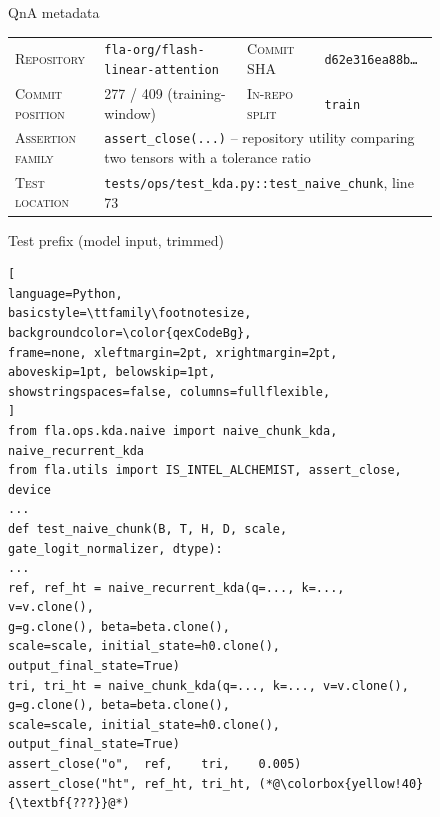 \documentclass[11pt]{article}
\begin{document}
\begin{figure}[!htbp]
\begin{center}
\begin{tcolorbox}[
enhanced,
colback=white, colframe=qexHead, coltitle=white,
fonttitle=\bfseries,
title={Detailed qualitative example: \texttt{fla-org/flash-linear-attention} (IR test, commit-derived)},
arc=3pt, boxrule=0.6pt,
top=3pt, bottom=3pt, left=6pt, right=6pt,
]

\begin{qexsection}{QnA metadata}
\footnotesize
\begin{tabular}{@{}l@{\;\;}l@{\hskip 14pt}l@{\;\;}l@{}}
\textsc{Repository}      & \texttt{fla-org/flash-linear-attention}     & \textsc{Commit SHA}        & \texttt{d62e316ea88b\ldots} \\
\textsc{Commit position} & 277 / 409 (training-window)                 & \textsc{In-repo split}     & \texttt{train} \\
\textsc{Assertion family} & \multicolumn{3}{l}{\texttt{assert\_close(...)} -- repository utility comparing two tensors with a tolerance ratio} \\
\textsc{Test location}   & \multicolumn{3}{l}{\texttt{tests/ops/test\_kda.py::test\_naive\_chunk}, line 73} \\
\end{tabular}
\end{qexsection}

\begin{qexsection}{Test prefix (model input, trimmed)}
\begin{lstlisting}[
language=Python,
basicstyle=\ttfamily\footnotesize,
backgroundcolor=\color{qexCodeBg},
frame=none, xleftmargin=2pt, xrightmargin=2pt,
aboveskip=1pt, belowskip=1pt,
showstringspaces=false, columns=fullflexible,
]
from fla.ops.kda.naive import naive_chunk_kda, naive_recurrent_kda
from fla.utils import IS_INTEL_ALCHEMIST, assert_close, device
...
def test_naive_chunk(B, T, H, D, scale, gate_logit_normalizer, dtype):
...
ref, ref_ht = naive_recurrent_kda(q=..., k=..., v=v.clone(),
g=g.clone(), beta=beta.clone(),
scale=scale, initial_state=h0.clone(),
output_final_state=True)
tri, tri_ht = naive_chunk_kda(q=..., k=..., v=v.clone(),
g=g.clone(), beta=beta.clone(),
scale=scale, initial_state=h0.clone(),
output_final_state=True)
assert_close("o",  ref,    tri,    0.005)
assert_close("ht", ref_ht, tri_ht, (*@\colorbox{yellow!40}{\textbf{???}}@*)
\end{lstlisting}
\end{qexsection}


\end{tcolorbox}
\end{center}
\end{figure}
\end{document}
